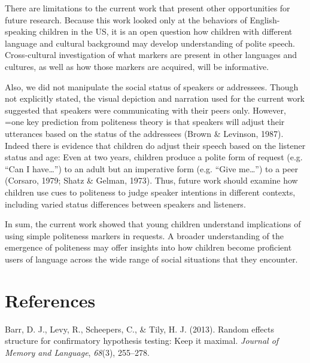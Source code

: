 \documentclass[10pt, letterpaper]{article}
\begin{document}
There are limitations to the current work that present other
opportunities for future research. Because this work looked only at the
behaviors of English-speaking children in the US, it is an open question
how children with different language and cultural background may develop
understanding of polite speech. Cross-cultural investigation of what
markers are present in other languages and cultures, as well as how
those markers are acquired, will be informative.

Also, we did not manipulate the social status of speakers or addressees.
Though not explicitly stated, the visual depiction and narration used
for the current work suggested that speakers were communicating with
their peers only. However, =one key prediction from politeness theory is
that speakers will adjust their utterances based on the status of the
addressees (Brown \& Levinson, 1987). Indeed there is evidence that
children do adjust their speech based on the listener status and age:
Even at two years, children produce a polite form of request (e.g. ``Can
I have\ldots{}'') to an adult but an imperative form (e.g. ``Give
me\ldots{}'') to a peer (Corsaro, 1979; Shatz \& Gelman, 1973). Thus,
future work should examine how children use cues to politeness to judge
speaker intentions in different contexts, including varied status
differences between speakers and listeners.

In sum, the current work showed that young children understand
implications of using simple politeness markers in requests. A broader
understanding of the emergence of politeness may offer insights into how
children become proficient users of language across the wide range of
social situations that they encounter.

\vspace{1em}
\vspace{1em} \noindent

\section{References}\label{references}

\setlength{\parindent}{-0.1in} \setlength{\leftskip}{0.125in} \noindent

\hypertarget{refs}{}
\hypertarget{ref-barr2013}{}
Barr, D. J., Levy, R., Scheepers, C., \& Tily, H. J. (2013). Random
effects structure for confirmatory hypothesis testing: Keep it maximal.
\emph{Journal of Memory and Language}, \emph{68}(3), 255--278.
\end{document}

